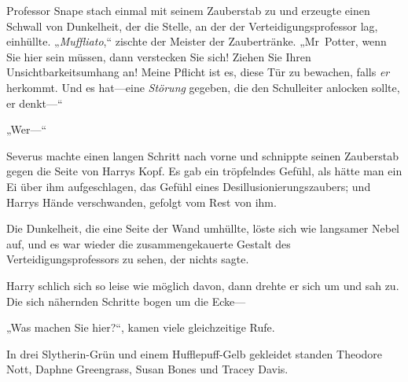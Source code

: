 Professor Snape stach einmal mit seinem Zauberstab zu und erzeugte einen Schwall von Dunkelheit, der die Stelle, an der der Verteidigungsprofessor lag, einhüllte.
„\emph{Muffliato},“ zischte der Meister der Zaubertränke. „Mr~Potter, wenn Sie hier sein müssen, dann verstecken Sie sich! Ziehen Sie Ihren Unsichtbarkeitsumhang an! Meine Pflicht ist es, diese Tür zu bewachen, falls \emph{er} herkommt. Und es hat—eine \emph{Störung} gegeben, die den Schulleiter anlocken sollte, er denkt—“

„Wer—“

Severus machte einen langen Schritt nach vorne und schnippte seinen Zauberstab gegen die Seite von Harrys Kopf. Es gab ein tröpfelndes Gefühl, als hätte man ein Ei über ihm aufgeschlagen, das Gefühl eines Desillusionierungszaubers; und Harrys Hände verschwanden, gefolgt vom Rest von ihm.

Die Dunkelheit, die eine Seite der Wand umhüllte, löste sich wie langsamer Nebel auf, und es war wieder die zusammengekauerte Gestalt des Verteidigungsprofessors zu sehen, der nichts sagte.

Harry schlich sich so leise wie möglich davon, dann drehte er sich um und sah zu.
Die sich nähernden Schritte bogen um die Ecke—

„Was machen Sie hier?“, kamen viele gleichzeitige Rufe.

In drei Slytherin-Grün und einem Hufflepuff-Gelb gekleidet standen Theodore Nott, Daphne Greengrass, Susan Bones und Tracey Davis.

